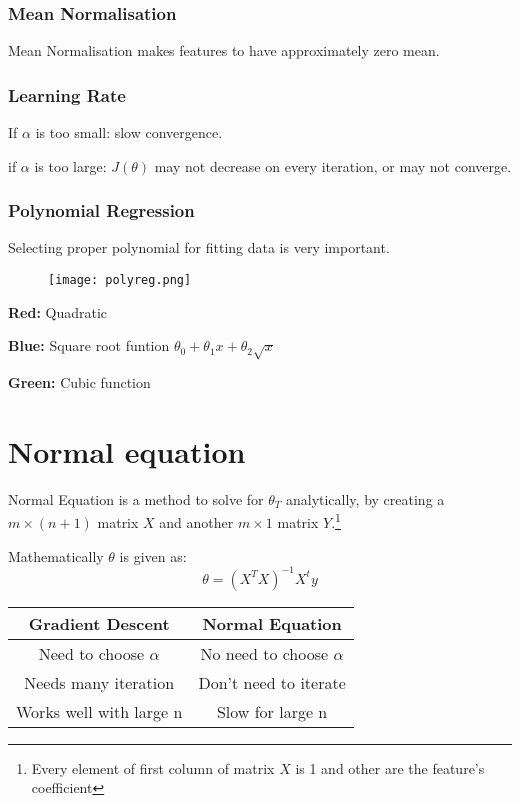 \documentclass[12pt]{report}
\begin{document}
\subsubsection{Mean Normalisation}
Mean Normalisation makes features to have approximately zero mean.

\subsubsection{Learning Rate}
If $\alpha$ is too small: slow convergence.

if $\alpha$ is too large: $J(\theta)$ may not decrease on every iteration, or may not converge.

\subsubsection{Polynomial Regression}
Selecting proper polynomial for fitting data is very important.

\begin{figure}[h]
	\texttt{[image: polyreg.png]}
\end{figure}

\textbf{Red:} Quadratic

\textbf {Blue:} Square root funtion $ \theta_0+\theta_1x+\theta_2\sqrt{x} $

\textbf {Green:} Cubic function

\section{Normal equation}
Normal Equation is a method to solve for $\theta_T$ analytically, by creating a $m\times(n+1)$ matrix $X$ and another $m\times1$ matrix $Y$.\footnote[2]{Every element of first column of matrix $X$ is 1 and other are the feature's coefficient}

Mathematically $\theta$ is given as:
\begin{equation} \label {eq: theta}
	\theta = (X^TX)^{-1}X^ty
\end{equation}

\begin{tabular}{ |c|c|}
	\hline
	\textbf{Gradient Descent} & \textbf{Normal Equation} \\
	\hline
	Need to choose $\alpha$ & No need to choose $\alpha$ \\
	Needs many iteration & Don't need to iterate \\
	Works well with large n & Slow for large n \\
	\hline
\end{tabular}
\end{document}
